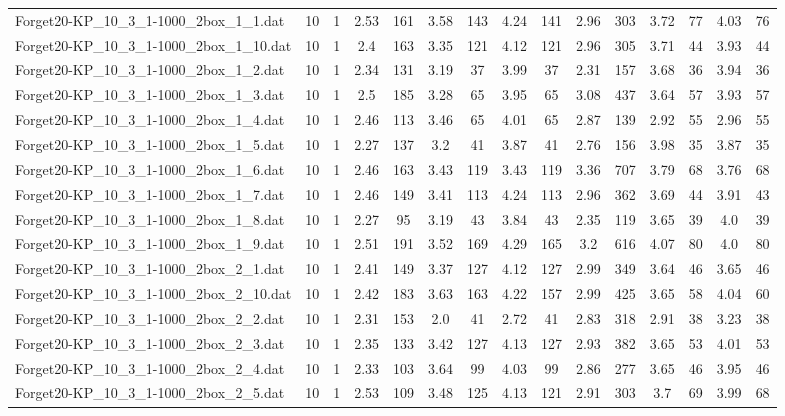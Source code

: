 \begin{table}[!ht]
{\begin{tabular}{lcccccccccccccc}
Forget20-KP\_10\_3\_1-1000\_2box\_1\_1.dat & 10 & 1 & 2.53 & 161 & 3.58 & 143 & 4.24 & 141 & 2.96 & 303 & 3.72 & 77 & 4.03 & 76 \\
Forget20-KP\_10\_3\_1-1000\_2box\_1\_10.dat & 10 & 1 & 2.4 & 163 & 3.35 & 121 & 4.12 & 121 & 2.96 & 305 & 3.71 & 44 & 3.93 & 44 \\
Forget20-KP\_10\_3\_1-1000\_2box\_1\_2.dat & 10 & 1 & 2.34 & 131 & 3.19 & 37 & 3.99 & 37 & 2.31 & 157 & 3.68 & 36 & 3.94 & 36 \\
Forget20-KP\_10\_3\_1-1000\_2box\_1\_3.dat & 10 & 1 & 2.5 & 185 & 3.28 & 65 & 3.95 & 65 & 3.08 & 437 & 3.64 & 57 & 3.93 & 57 \\
Forget20-KP\_10\_3\_1-1000\_2box\_1\_4.dat & 10 & 1 & 2.46 & 113 & 3.46 & 65 & 4.01 & 65 & 2.87 & 139 & 2.92 & 55 & 2.96 & 55 \\
Forget20-KP\_10\_3\_1-1000\_2box\_1\_5.dat & 10 & 1 & 2.27 & 137 & 3.2 & 41 & 3.87 & 41 & 2.76 & 156 & 3.98 & 35 & 3.87 & 35 \\
Forget20-KP\_10\_3\_1-1000\_2box\_1\_6.dat & 10 & 1 & 2.46 & 163 & 3.43 & 119 & 3.43 & 119 & 3.36 & 707 & 3.79 & 68 & 3.76 & 68 \\
Forget20-KP\_10\_3\_1-1000\_2box\_1\_7.dat & 10 & 1 & 2.46 & 149 & 3.41 & 113 & 4.24 & 113 & 2.96 & 362 & 3.69 & 44 & 3.91 & 43 \\
Forget20-KP\_10\_3\_1-1000\_2box\_1\_8.dat & 10 & 1 & 2.27 & 95 & 3.19 & 43 & 3.84 & 43 & 2.35 & 119 & 3.65 & 39 & 4.0 & 39 \\
Forget20-KP\_10\_3\_1-1000\_2box\_1\_9.dat & 10 & 1 & 2.51 & 191 & 3.52 & 169 & 4.29 & 165 & 3.2 & 616 & 4.07 & 80 & 4.0 & 80 \\
Forget20-KP\_10\_3\_1-1000\_2box\_2\_1.dat & 10 & 1 & 2.41 & 149 & 3.37 & 127 & 4.12 & 127 & 2.99 & 349 & 3.64 & 46 & 3.65 & 46 \\
Forget20-KP\_10\_3\_1-1000\_2box\_2\_10.dat & 10 & 1 & 2.42 & 183 & 3.63 & 163 & 4.22 & 157 & 2.99 & 425 & 3.65 & 58 & 4.04 & 60 \\
Forget20-KP\_10\_3\_1-1000\_2box\_2\_2.dat & 10 & 1 & 2.31 & 153 & 2.0 & 41 & 2.72 & 41 & 2.83 & 318 & 2.91 & 38 & 3.23 & 38 \\
Forget20-KP\_10\_3\_1-1000\_2box\_2\_3.dat & 10 & 1 & 2.35 & 133 & 3.42 & 127 & 4.13 & 127 & 2.93 & 382 & 3.65 & 53 & 4.01 & 53 \\
Forget20-KP\_10\_3\_1-1000\_2box\_2\_4.dat & 10 & 1 & 2.33 & 103 & 3.64 & 99 & 4.03 & 99 & 2.86 & 277 & 3.65 & 46 & 3.95 & 46 \\
Forget20-KP\_10\_3\_1-1000\_2box\_2\_5.dat & 10 & 1 & 2.53 & 109 & 3.48 & 125 & 4.13 & 121 & 2.91 & 303 & 3.7 & 69 & 3.99 & 68 \\

\end{tabular}}
\end{table}
